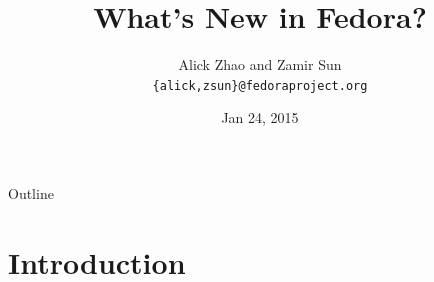 \documentclass{beamer}
\title{What's New in Fedora?}
\author[alick \& zsun] %
{Alick Zhao and Zamir Sun\\ \texttt{\{alick,zsun\}@fedoraproject.org}}
\date[Fedora 21 Release Party] %
{Jan 24, 2015}
\begin{document}
\begin{frame}
  \titlepage
\end{frame}

\begin{frame}{Outline}
  \tableofcontents
\end{frame}




\section{Introduction}

\end{document}
